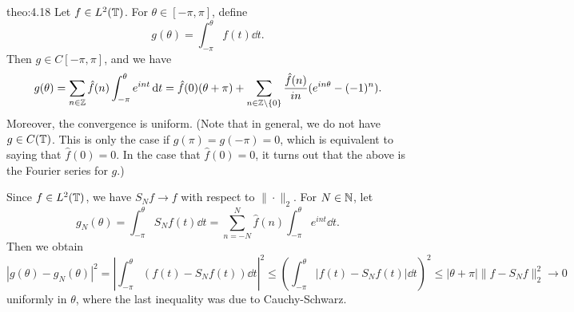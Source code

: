\begin{theo}{theo:4.18}
    Let $f \in L^2(\mathbb{T})$. For $\theta \in [-\pi, \pi]$, define 
    \[ g(\theta) = \int_{-\pi}^\theta f(t)\dd t. \] 
    Then $g \in C[-\pi, \pi]$, and we have 
    \begin{align*}
        g(\theta) = \sum_{n\in\mathbb{Z}} \hat f(n) \int_{-\pi}^\theta  e^{int}\,\mathrm{d} t 
        = \hat f(0) (\theta + \pi) + \sum_{n\in\mathbb{Z}\setminus\{0\}} 
        \frac{\hat f(n)}{in} (e^{in\theta} - (-1)^n). 
    \end{align*}
    Moreover, the convergence is uniform. (Note that in general, 
    we do not have $g \in C(\mathbb{T})$. This is only the case if 
    $g(\pi) = g(-\pi) = 0$, which is equivalent to saying that 
    $\hat f(0) = 0$. In the case that $\hat f(0) = 0$, it turns out 
    that the above is the Fourier series for $g$.)
\end{theo}
\begin{pf}
    Since $f \in L^2(\mathbb{T})$, we have $S_N f \to f$ with respect to $\|\cdot\|_2$. 
    For $N \in \mathbb{N}$, let 
    \[ g_N(\theta) = \int_{-\pi}^\theta S_N f(t)\dd t = 
    \sum_{n=-N}^N \hat f(n) \int_{-\pi}^\theta e^{int}\dd t. \] 
    Then we obtain 
    \[ |g(\theta) - g_N(\theta)|^2 
    = \left| \int_{-\pi}^\theta (f(t) - S_Nf(t))\dd t \right|^2 
    \leq \left( \int_{-\pi}^\theta |f(t) - S_Nf(t)|\dd t \right)^{\!2} 
    \leq |\theta + \pi| \|f - S_N f\|_2^2  \to 0 \] 
    uniformly in $\theta$, where the last inequality was due 
    to Cauchy-Schwarz. 
\end{pf}
